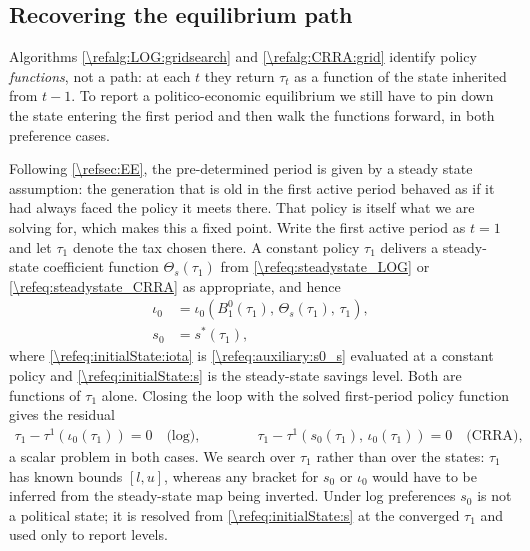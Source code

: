 \subsection{Recovering the equilibrium path}\label{\refsec:PEEpath}
Algorithms \ref{\refalg:LOG:gridsearch} and \ref{\refalg:CRRA:grid} identify policy \emph{functions}, not a path: at each $t$ they return $\tau_t$ as a function of the state inherited from $t-1$. To report a politico-economic equilibrium we still have to pin down the state entering the first period and then walk the functions forward, in both preference cases.

Following \cref{\refsec:EE}, the pre-determined period is given by a steady state assumption: the generation that is old in the first active period behaved as if it had always faced the policy it meets there. That policy is itself what we are solving for, which makes this a fixed point. Write the first active period as $t=1$ and let $\tau_1$ denote the tax chosen there. A constant policy $\tau_1$ delivers a steady-state coefficient function $\Theta_s(\tau_1)$ from \eqref{\refeq:steadystate_LOG} or \eqref{\refeq:steadystate_CRRA} as appropriate, and hence
\begin{subequations}\label{\refeq:initialState}
\begin{align}
    \iota_0 &= \iota_0\left(B_1^0(\tau_1),\, \Theta_s(\tau_1),\, \tau_1\right), \label{\refeq:initialState:iota}\\
    s_0 &= s^*(\tau_1), \label{\refeq:initialState:s}
\end{align}
\end{subequations}
where \eqref{\refeq:initialState:iota} is \eqref{\refeq:auxiliary:s0_s} evaluated at a constant policy and \eqref{\refeq:initialState:s} is the steady-state savings level. Both are functions of $\tau_1$ alone. Closing the loop with the solved first-period policy function gives the residual
\begin{align}\label{\refeq:initialFixedPoint}
    \tau_1 - \tau^{1}\left(\iota_0(\tau_1)\right) = 0 \quad\text{(log)}, \qquad\qquad
    \tau_1 - \tau^{1}\left(s_0(\tau_1),\, \iota_0(\tau_1)\right) = 0 \quad\text{(CRRA)},
\end{align}
a scalar problem in both cases. We search over $\tau_1$ rather than over the states: $\tau_1$ has known bounds $[l,u]$, whereas any bracket for $s_0$ or $\iota_0$ would have to be inferred from the steady-state map being inverted. Under log preferences $s_0$ is not a political state; it is resolved from \eqref{\refeq:initialState:s} at the converged $\tau_1$ and used only to report levels.

